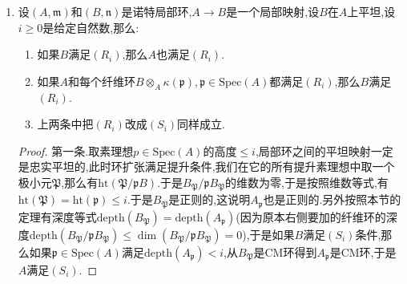 \begin{enumerate}
\begin{proof}
    	记第$i$分量为$1_{K_i}$,其余分量取零的元为$e_i$,那么$e_i$满足$e_i^2-e_i=0$,于是全部$e_i$在$A$上整,于是$e_i\in A$,于是从$\sum e_i=1_A$和$e_ie_j=0,\forall i\not=j$得到$A=Ae_1\times Ae_2\times\cdots\times Ae_r$(这是同构,其中满是因为$a_1e_1+a_2e_2+\cdots+a_re_r$映射过去是$(a_1e_1,a_2e_2,\cdots,a_re_r)$).最后按照$A$是局部环,说明$r=1$,否则可构造多个不同的极大理想,于是$A$是正规整环.
    \end{proof}
    \item 设$(A,\mathfrak{m})$和$(B,\mathfrak{n})$是诺特局部环,$A\to B$是一个局部映射,设$B$在$A$上平坦,设$i\ge0$是给定自然数,那么:
    \begin{enumerate}
    	\item 如果$B$满足$(R_i)$,那么$A$也满足$(R_i)$.
    	\item 如果$A$和每个纤维环$B\otimes_A\kappa(\mathfrak{p}),\mathfrak{p}\in\mathrm{Spec}(A)$都满足$(R_i)$,那么$B$满足$(R_i)$.
    	\item 上两条中把$(R_i)$改成$(S_i)$同样成立.
    \end{enumerate}
    \begin{proof}
    	
    	第一条.取素理想$p\in\mathrm{Spec}(A)$的高度$\le i$,局部环之间的平坦映射一定是忠实平坦的,此时环扩张满足提升条件,我们在它的所有提升素理想中取一个极小元$\mathfrak{P}$,那么有$\mathrm{ht}(\mathfrak{P}/\mathfrak{p}B)$.于是$B_{\mathfrak{P}}/\mathfrak{p}B_{\mathfrak{P}}$的维数为零,于是按照维数等式,有$\mathrm{ht}(\mathfrak{P})=\mathrm{ht}(\mathfrak{p})\le i$.于是$B_{\mathfrak{P}}$是正则的,这说明$A_{\mathfrak{p}}$也是正则的.另外按照本节的定理有深度等式$\mathrm{depth}(B_{\mathfrak{P}})=\mathrm{depth}(A_{\mathfrak{p}})$(因为原本右侧要加的纤维环的深度$\mathrm{depth}(B_{\mathfrak{P}}/\mathfrak{p}B_{\mathfrak{P}})\le\dim(B_{\mathfrak{P}}/\mathfrak{p}B_{\mathfrak{P}})=0$),于是如果$B$满足$(S_i)$条件,那么如果$\mathfrak{p}\in\mathrm{Spec}(A)$满足$\mathrm{depth}(A_{\mathfrak{p}})<i$,从$B_{\mathfrak{P}}$是CM环得到$A_\mathfrak{p}$是CM环,于是$A$满足$(S_i)$.
    	

\end{proof}
\end{enumerate}
